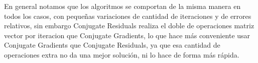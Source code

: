 \documentclass{article}
\begin{document}
En general notamos que los algoritmos se comportan de la misma manera en todos los casos, con pequeñas variaciones de cantidad de iteraciones y de errores relativos, sin embargo Conjugate Residuals realiza el doble de operaciones matriz vector por iteracion que Conjugate Gradients, lo que hace más conveniente usar Conjugate Gradients que Conjugate Residuals, ya que esa cantidad de operaciones extra no da una mejor solución, ni lo hace de forma más rápida.
\end{document}
